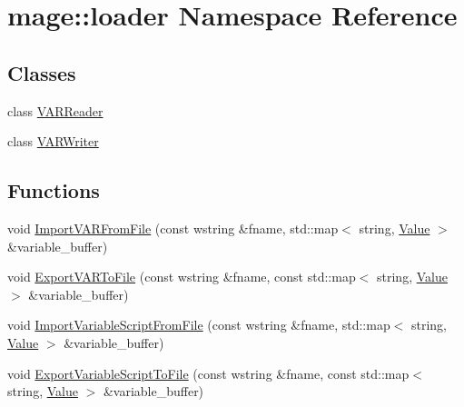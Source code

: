 \hypertarget{namespacemage_1_1loader}{}\section{mage\+:\+:loader Namespace Reference}
\label{namespacemage_1_1loader}
\subsection*{Classes}
\begin{DoxyCompactItemize}
\item 
class \hyperlink{classmage_1_1loader_1_1_v_a_r_reader}{V\+A\+R\+Reader}
\item 
class \hyperlink{classmage_1_1loader_1_1_v_a_r_writer}{V\+A\+R\+Writer}
\end{DoxyCompactItemize}
\subsection*{Functions}
\begin{DoxyCompactItemize}
\item 
void \hyperlink{namespacemage_1_1loader_a03513131b24e70c81e6956df5f92b520}{Import\+V\+A\+R\+From\+File} (const wstring \&fname, std\+::map$<$ string, \hyperlink{namespacemage_aa1fe0628487e0706e44efdc62dbdb3a2}{Value} $>$ \&variable\+\_\+buffer)
\item 
void \hyperlink{namespacemage_1_1loader_aff43f426c240958542537ad374dca201}{Export\+V\+A\+R\+To\+File} (const wstring \&fname, const std\+::map$<$ string, \hyperlink{namespacemage_aa1fe0628487e0706e44efdc62dbdb3a2}{Value} $>$ \&variable\+\_\+buffer)
\item 
void \hyperlink{namespacemage_1_1loader_ace2beab3ac83ed7d27f24e392ae981cc}{Import\+Variable\+Script\+From\+File} (const wstring \&fname, std\+::map$<$ string, \hyperlink{namespacemage_aa1fe0628487e0706e44efdc62dbdb3a2}{Value} $>$ \&variable\+\_\+buffer)
\item 
void \hyperlink{namespacemage_1_1loader_a1d82435c3f70b2a58351652947c309b2}{Export\+Variable\+Script\+To\+File} (const wstring \&fname, const std\+::map$<$ string, \hyperlink{namespacemage_aa1fe0628487e0706e44efdc62dbdb3a2}{Value} $>$ \&variable\+\_\+buffer)
\end{DoxyCompactItemize}
